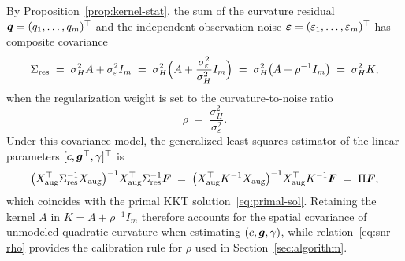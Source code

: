 By Proposition~\ref{prop:kernel-stat}, the sum of the curvature residual $\boldsymbol{q} = (q_1, \dots, q_m)^\top$ and the independent observation noise $\boldsymbol{\varepsilon} = (\varepsilon_1, \dots, \varepsilon_m)^\top$ has composite covariance
\[
  \Sigma_{\mathrm{res}} \;=\; \sigma_H^2 A + \sigma_\varepsilon^2 I_m \;=\; \sigma_H^2 \Bigl(A + \frac{\sigma_\varepsilon^2}{\sigma_H^2} I_m\Bigr) \;=\; \sigma_H^2 \bigl(A + \rho^{-1} I_m\bigr) \;=\; \sigma_H^2 K,
\]
when the regularization weight is set to the curvature-to-noise ratio
\begin{equation}\label{eq:snr-rho}
  \rho \;=\; \frac{\sigma_H^2}{\sigma_\varepsilon^2}.
\end{equation}
Under this covariance model, the generalized least-squares estimator of the linear parameters $[c, \boldsymbol{g}^\top, \gamma]^\top$ is
\[
  \bigl(X_{\mathrm{aug}}^\top \Sigma_{\mathrm{res}}^{-1} X_{\mathrm{aug}}\bigr)^{-1} X_{\mathrm{aug}}^\top \Sigma_{\mathrm{res}}^{-1} \boldsymbol{F}
  \;=\; \bigl(X_{\mathrm{aug}}^\top K^{-1} X_{\mathrm{aug}}\bigr)^{-1} X_{\mathrm{aug}}^\top K^{-1} \boldsymbol{F}
  \;=\; \Pi \boldsymbol{F},
\]
which coincides with the primal KKT solution~\eqref{eq:primal-sol}. Retaining the kernel $A$ in $K = A + \rho^{-1}I_m$ therefore accounts for the spatial covariance of unmodeled quadratic curvature when estimating $(c, \boldsymbol{g}, \gamma)$, while relation~\eqref{eq:snr-rho} provides the calibration rule for $\rho$ used in Section~\ref{sec:algorithm}.


